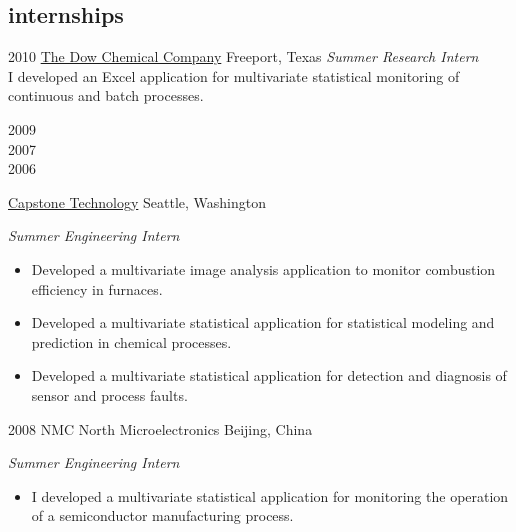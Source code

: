 \documentclass[]{friggeri-cv} %
\begin{document}

\subsection{internships}

\begin{entrylist}

\entry
{2010}
{\href{http://www.dow.com/}{The Dow Chemical Company}}
{Freeport, Texas}
{\emph{Summer Research Intern} \\
I developed an Excel application for multivariate statistical monitoring of continuous and batch processes.}


\entry
{\begin{minipage}[t]{2cm}2009 \\ 2007 \\ 2006\end{minipage}}
{\href{http://www.capstonetechnology.com}{Capstone Technology}}
{Seattle, Washington}
{\emph{Summer Engineering Intern}
\begin{itemize}
	\item Developed a multivariate image analysis application to monitor combustion efficiency in furnaces.
	\item Developed a multivariate statistical application for statistical modeling and prediction in chemical processes.
	\item Developed a multivariate statistical application for detection and diagnosis of sensor and process faults.
\end{itemize}}


\entry
{2008}
{NMC North Microelectronics}
{Beijing, China}
{\emph{Summer Engineering Intern}
\begin{itemize}
	\item I developed a multivariate statistical application for monitoring the operation of a semiconductor manufacturing process.
\end{itemize}}





\end{entrylist}

\end{document}
